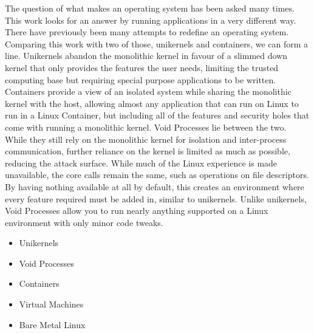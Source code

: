 \documentclass[sigplan]{acmart}
\begin{document}
The question of what makes an operating system has been asked many times. This work looks for an answer by running applications in a very different way. There have previously been many attempts to redefine an operating system. Comparing this work with two of those, unikernels and containers, we can form a line. Unikernels abandon the monolithic kernel in favour of a slimmed down kernel that only provides the features the user needs, limiting the trusted computing base but requiring special purpose applications to be written. Containers provide a view of an isolated system while sharing the monolithic kernel with the host, allowing almost any application that can run on Linux to run in a Linux Container, but including all of the features and security holes that come with running a monolithic kernel. Void Processes lie between the two. While they still rely on the monolithic kernel for isolation and inter-process communication, further reliance on the kernel is limited as much as possible, reducing the attack surface. While much of the Linux experience is made unavailable, the core calls remain the same, such as operations on file descriptors. By having nothing available at all by default, this creates an environment where every feature required must be added in, similar to unikernels. Unlike unikernels, Void Processes allow you to run nearly anything supported on a Linux environment with only minor code tweaks.

\begin{itemize}
    \item Unikernels
    \item Void Processes
    \item Containers
    \item Virtual Machines
    \item Bare Metal Linux
\end{itemize}

\end{document}
